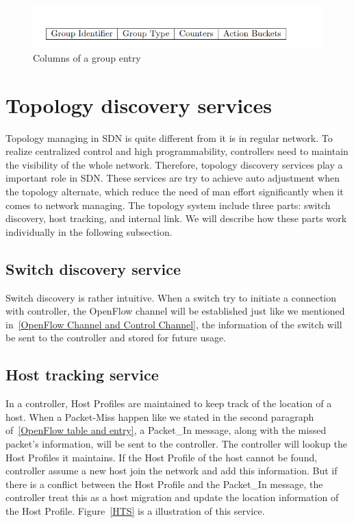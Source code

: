 \begin{figure}[H]
\begin{center} 
\includegraphics[width=1\textwidth]{figures/group_table.png}
\end{center}
\caption{Columns of a group entry}
\label{GE_Col}
\end{figure}

\section{Topology discovery services}
\label{Topology discovery services}
Topology managing in SDN is quite different from it is in regular network. To realize centralized control and high programmability, controllers need to maintain the visibility of the whole network. Therefore, topology discovery services play a important role in SDN. These services are try to achieve auto adjustment when the topology alternate, which reduce the need of man effort significantly when it comes to network managing. The topology system include three parts: switch discovery, host tracking, and internal link. We will describe how these parts work individually in the following subsection.

\subsection{Switch discovery service}
\label{Switch discovery service}
Switch discovery is rather intuitive. When a switch try to initiate a connection with controller, the OpenFlow channel will be established just like we mentioned in~\ref{OpenFlow Channel and Control Channel}, the information of the switch will be sent to the controller and stored for future usage. 

\subsection{Host tracking service}
\label{Host tracking service}
In a controller, Host Profiles are maintained to keep track of the location of a host. When a Packet-Miss happen like we stated in the second paragraph of~\ref{OpenFlow table and entry}, a Packet\_In message, along with the missed packet's information, will be sent to the controller. The controller will lookup the Host Profiles it maintains. If the Host Profile of the host cannot be found, controller assume a new host join the network and add this information. But if there is a conflict between the Host Profile and the Packet\_In message, the controller treat this as a host migration and update the location information of the Host Profile. Figure~\ref{HTS} is a illustration of this service.

